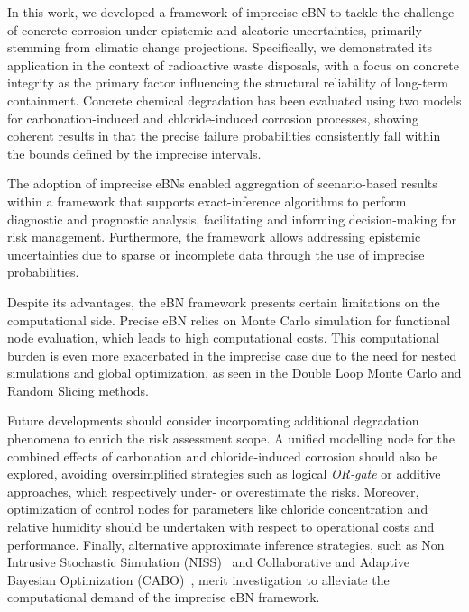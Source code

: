 In this work, we developed a framework of imprecise eBN to tackle the challenge of concrete corrosion under epistemic and aleatoric uncertainties, primarily stemming from climatic change projections. 
Specifically, we demonstrated its application in the context of radioactive waste disposals, with a focus on concrete integrity as the primary factor influencing the structural reliability of long-term containment. 
Concrete chemical degradation has been evaluated using two models for carbonation-induced and chloride-induced corrosion processes, showing coherent results in that the precise failure probabilities consistently fall within the bounds defined by the imprecise intervals.

The adoption of imprecise eBNs enabled aggregation of scenario-based results within a framework that supports exact-inference algorithms to perform diagnostic and prognostic analysis, facilitating and informing decision-making for risk management. Furthermore, the framework allows addressing epistemic uncertainties due to sparse or incomplete data through the use of imprecise probabilities.

Despite its advantages, the eBN framework presents certain limitations on the computational side. Precise eBN relies on Monte Carlo simulation for functional node evaluation, which leads to high computational costs. This computational burden is even more exacerbated in the imprecise case due to the need for nested simulations and global optimization, as seen in the Double Loop Monte Carlo and Random Slicing methods.

Future developments should consider incorporating additional degradation phenomena to enrich the risk assessment scope. A unified modelling node for the combined effects of carbonation and chloride-induced corrosion should also be explored, avoiding oversimplified strategies such as logical \textit{OR-gate} or additive approaches, which respectively under- or overestimate the risks. Moreover, optimization of control nodes for parameters like chloride concentration and relative humidity should be undertaken with respect to operational costs and performance. Finally, alternative approximate inference strategies, such as Non Intrusive Stochastic Simulation (NISS)~\cite{wei_non-intrusive_2019} and Collaborative and Adaptive Bayesian Optimization (CABO)~\cite{hong_sequential_2024}, merit investigation to alleviate the computational demand of the imprecise eBN framework.